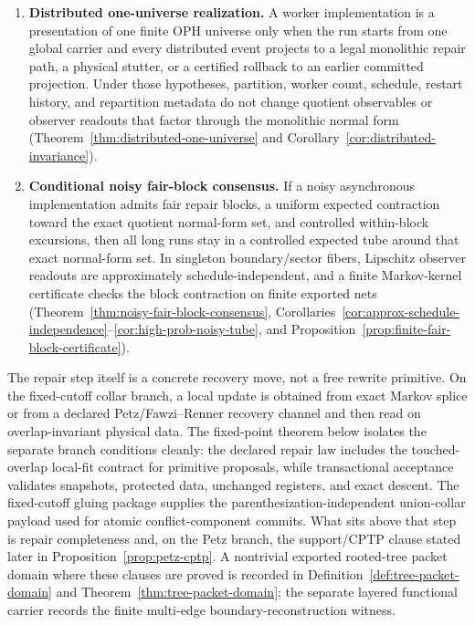 \documentclass[11pt]{article}
\theoremstyle{remark}
\theoremstyle{plain}
\begin{document}
\begin{enumerate}
``simulation'' requires recovery-derived endogenous update, nontrivial quotient-readable
records, strict overlap-repair descent with a schedule-independent normal form, collapse of a
proper candidate basin to one consistent quotient state, and implementation/clock closure.
Under the stated selected-fiber and record hypotheses, the finite OPH packet has this
certificate; a generic identity fixed point or constant variational functional does not
(Definition~\ref{def:oph-simulation}, Theorem~\ref{thm:oph-simulation}, and
Remark~\ref{rem:oph-simulation-falsifiers}).
\item \textbf{Distributed one-universe realization.} A worker implementation is a presentation
of one finite OPH universe only when the run starts from one global carrier and every distributed
event projects to a legal monolithic repair path, a physical stutter, or a certified rollback to
an earlier committed projection. Under those hypotheses, partition, worker count, schedule,
restart history, and repartition metadata do not change quotient observables or observer readouts
that factor through the monolithic normal form (Theorem~\ref{thm:distributed-one-universe} and
Corollary~\ref{cor:distributed-invariance}).
\item \textbf{Conditional noisy fair-block consensus.} If a noisy asynchronous implementation admits fair repair blocks, a uniform expected contraction toward the exact quotient normal-form set, and controlled within-block excursions, then all long runs stay in a controlled expected tube around that exact normal-form set. In singleton boundary/sector fibers, Lipschitz observer readouts are approximately schedule-independent, and a finite Markov-kernel certificate checks the block contraction on finite exported nets (Theorem~\ref{thm:noisy-fair-block-consensus}, Corollaries~\ref{cor:approx-schedule-independence}--\ref{cor:high-prob-noisy-tube}, and Proposition~\ref{prop:finite-fair-block-certificate}).
\end{enumerate}

The repair step itself is a concrete recovery move, not a free rewrite primitive. On the
fixed-cutoff collar branch, a local update is obtained from exact Markov splice or from a
declared Petz/Fawzi--Renner recovery channel and then read on overlap-invariant physical data.
The fixed-point theorem below isolates the separate branch conditions cleanly: the declared
repair law includes the touched-overlap local-fit contract for primitive proposals, while
transactional acceptance validates snapshots, protected data, unchanged registers, and exact
descent. The fixed-cutoff gluing package supplies the parenthesization-independent union-collar
payload used for atomic conflict-component commits. What sits above that step is repair
completeness and, on the Petz branch, the support/CPTP clause stated later in
Proposition~\ref{prop:petz-cptp}.
A nontrivial exported rooted-tree packet domain where these clauses are proved is recorded in
Definition~\ref{def:tree-packet-domain} and Theorem~\ref{thm:tree-packet-domain}; the separate
layered functional carrier records the finite multi-edge boundary-reconstruction witness.
\end{document}
